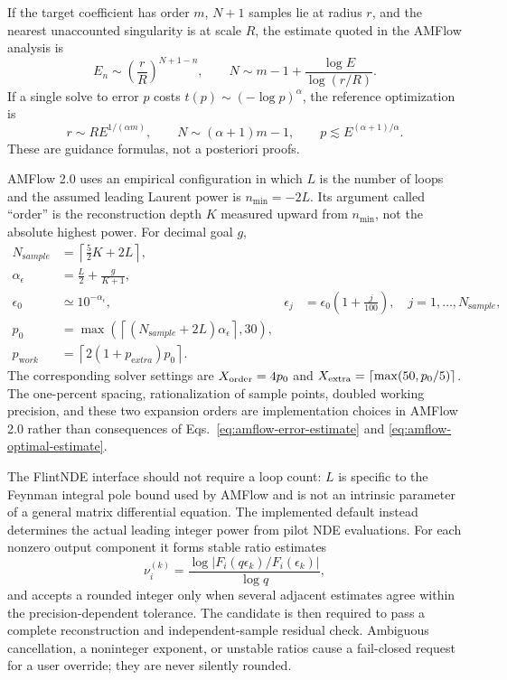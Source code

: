 \documentclass[11pt]{article}
\newcommand{\eps}{\epsilon}
\begin{document}
If the target coefficient has order $m$, $N+1$ samples lie at radius $r$, and the nearest
unaccounted singularity is at scale $R$, the estimate quoted in the AMFlow analysis is
\begin{equation}
  E_n\sim\left(\frac rR\right)^{N+1-n},
  \qquad
  N\sim m-1+\frac{\log E}{\log(r/R)}.
  \label{eq:amflow-error-estimate}
\end{equation}
If a single solve to error $p$ costs $t(p)\sim(-\log p)^\alpha$, the reference optimization is
\begin{equation}
  r\sim R E^{1/(\alpha m)},
  \qquad N\sim(\alpha+1)m-1,
  \qquad p\lesssim E^{(\alpha+1)/\alpha}.
  \label{eq:amflow-optimal-estimate}
\end{equation}
These are guidance formulas, not a posteriori proofs.

AMFlow 2.0 uses an empirical configuration \cite{Huang:2026rjb} in which $L$ is the number
of loops and the
assumed leading Laurent power is $n_{\min}=-2L$.  Its argument called ``order'' is the
reconstruction depth $K$ measured upward from $n_{\min}$, not the absolute highest power.
For decimal goal $g$,
\begin{align}
  N_{\mathrm sample}&=\left\lceil\frac52K+2L\right\rceil,\\
  \alpha_\eps&=\frac L2+\frac{g}{K+1},\\
  \eps_0&\simeq10^{-\alpha_\eps},
  &\eps_j&=\eps_0\left(1+\frac{j}{100}\right),\quad j=1,\ldots,N_{\mathrm sample},\\
  p_0&=\max\left(\left\lceil(N_{\mathrm sample}+2L)\alpha_\eps\right\rceil,30\right),\\
  p_{\mathrm work}&=\left\lceil2(1+p_{\mathrm extra})p_0\right\rceil.
  \label{eq:amflow-default-config}
\end{align}
The corresponding solver settings are $X_{\rm order}=4p_0$ and
$X_{\rm extra}=\lceil\max(50,p_0/5)\rceil$.  The one-percent spacing, rationalization of
sample points, doubled working precision, and these two expansion orders are implementation
choices in AMFlow 2.0 rather than consequences of Eqs.~\eqref{eq:amflow-error-estimate} and
\eqref{eq:amflow-optimal-estimate}.

The FlintNDE interface should not require a loop count: $L$ is specific to the Feynman
integral pole bound used by AMFlow and is not an intrinsic parameter of a general matrix
differential equation.  The implemented default instead determines the actual leading integer
power from pilot NDE evaluations.  For each nonzero output component it forms stable ratio
estimates
\begin{equation}
  \nu_i^{(k)}=
  \frac{\log|F_i(q\eps_k)/F_i(\eps_k)|}{\log q},
\end{equation}
and accepts a rounded integer only when several adjacent estimates agree within the
precision-dependent tolerance.  The candidate is then required to pass a complete
reconstruction and independent-sample residual check.  Ambiguous cancellation, a
noninteger exponent, or unstable ratios cause a fail-closed request for a user override;
they are never silently rounded.
\end{document}
